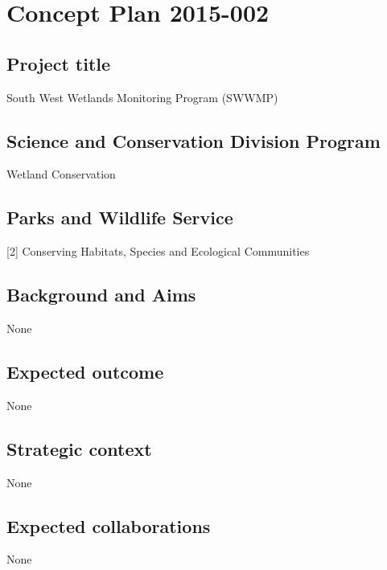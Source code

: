 \documentclass[version=last, paper=a4, DIV=18, usenames, dvipsnames]{scrartcl}
\begin{document}
%

%



\section*{Concept Plan 2015-002}

\subsection*{Project title}
South West Wetlands Monitoring Program (SWWMP)



\subsection*{Science and Conservation Division Program}
Wetland Conservation



\subsection*{Parks and Wildlife Service}
{[}2{]} Conserving Habitats, Species and Ecological Communities



\subsection*{Background and Aims}
None



\subsection*{Expected outcome}
None



\subsection*{Strategic context}
None



\subsection*{Expected collaborations}
None
\end{document}
